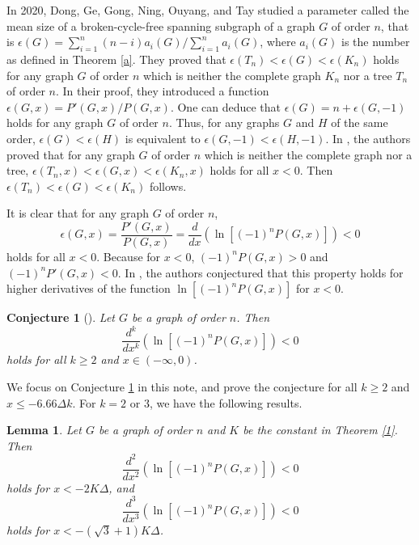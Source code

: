 \documentclass[12pt]{article}
\newtheorem{conjecture}[theorem]{Conjecture}
\newtheorem{lemma}[theorem]{Lemma}
\theoremstyle{definition}
\begin{document}
In 2020, Dong, Ge, Gong, Ning, Ouyang, and Tay \cite{D21} studied a parameter called the mean size of a broken-cycle-free spanning subgraph of a graph $G$ of order $n$, that is
$\epsilon(G)=\sum\limits_{i=1}^{n} (n-i) a_i(G)/\sum\limits_{i=1}^{n} a_i(G)$, where \( a_i(G) \) is the number as defined in Theorem \ref{a}. They proved that $\epsilon(T_n)<\epsilon(G)<\epsilon(K_n)$ holds for any graph $G$ of order $n$ which is neither the
complete graph $K_n$ nor a tree $T_n$ of order $n$. In their proof, they introduced a function $\epsilon(G,x)=P'(G,x)/P(G,x)$. One can deduce that $\epsilon(G)=n+\epsilon(G,-1)$ holds for any graph $G$ of order $n$. Thus, for any graphs $G$ and $H$ of the same order, $\epsilon(G)<\epsilon(H)$ is equivalent to $\epsilon(G,-1)<\epsilon(H,-1)$. In \cite{D21}, the authors proved that for any graph $G$ of order $n$ which is neither the complete graph nor a tree, $\epsilon(T_n,x)<\epsilon(G,x)<\epsilon(K_n,x)$ holds for all $x<0$. Then $\epsilon(T_n)<\epsilon(G)<\epsilon(K_n)$ follows.

It is clear that for any graph \( G \) of order \( n \),
\begin{equation*}
\epsilon(G,x)=\frac{P'(G, x)}{P(G, x)}=\frac{d}{dx} (\ln[(-1)^n P(G, x)])< 0
\end{equation*}
holds for all \( x < 0 \). Because for $x<0$, \((-1)^n P(G, x)>0\) and \((-1)^n P'(G, x)<0\). In \cite{D21}, the authors conjectured that this property holds for higher derivatives of the function \(\ln[(-1)^n P(G, x)]\) for $x<0$.


\begin{conjecture}[\cite{D21}]\label{con} Let \( G \) be a graph of order \( n \). Then
\[
\frac{d^k}{dx^k} (\ln[(-1)^n P(G, x)]) < 0
\]
holds for all \( k \geq 2 \) and \( x \in (-\infty, 0) \).
\end{conjecture}


We focus on Conjecture \ref{con} in this note, and prove the conjecture for all $k\geq 2$ and \( x\leq -6.66\Delta k \).  For $k=2$ or $3$, we have the following results.

\begin{lemma}\label{le}
Let \( G \) be a graph of order \( n \) and $K$ be the constant in Theorem \ref{1}. Then
\[
\frac{d^2}{dx^2} (\ln[(-1)^n P(G, x)]) < 0
\]
holds for \( x <-2K\Delta\), and  \[
\frac{d^3}{dx^3} (\ln[(-1)^n P(G, x)]) < 0
\]
holds for \( x <-(\sqrt{3}+1)K\Delta\).
\end{lemma}
\end{document}
